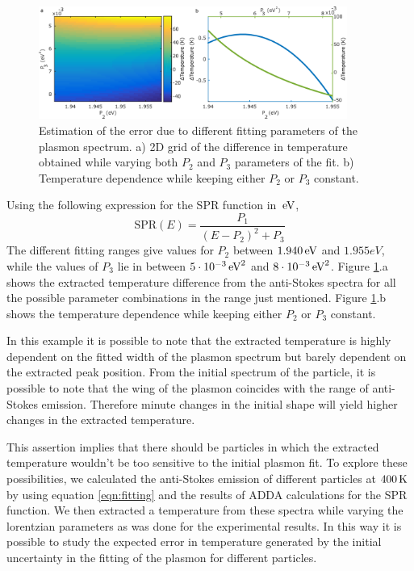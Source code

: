 \begin{figure}[htp] \centering
\includegraphics[width=0.90\textwidth]{Chapters/04_Anti-Stokes/Figures/05_Estimation_error/05_estimation_error.png}
\caption{Estimation of the error due to different fitting parameters of the
plasmon spectrum. a) 2D grid of the difference in temperature obtained while
varying both $P_2$ and $P_3$ parameters of the fit. b) Temperature dependence
while keeping either $P_2$ or $P_3$ constant.}
	\label{fig:estimation-error}
\end{figure}

Using the following expression for the SPR function in $\,\textrm{eV}$, 
\begin{equation*}
\textrm{SPR}(E) = \frac{P_1}{(E-P_2)^2+P_3}
\end{equation*}
The different fitting ranges give values for $P_2$ between $1.940\,\textrm{eV}$ and
$1.955eV$, while the values of $P_3$ lie in between $5\cdot10^{-3}\,\textrm{eV}^2$ and
$8\cdot10^{-3}\,\textrm{eV}^2$. Figure \ref{fig:estimation-error}.a shows the extracted
temperature difference from the anti-Stokes spectra for all the possible
parameter combinations in the range just mentioned. Figure \ref{fig:estimation-error}.b
shows the temperature dependence while keeping either $P_2$ or $P_3$ constant.

In this example it is possible to note that the extracted temperature is highly
dependent on the fitted width of the plasmon spectrum but barely dependent on
the extracted peak position. From the initial spectrum of the particle, it is
possible to note that the wing of the plasmon coincides with the range of
anti-Stokes emission. Therefore minute changes in the initial shape will yield
higher changes in the extracted temperature.

This assertion implies that there should be particles in which the extracted
temperature wouldn't be too sensitive to the initial plasmon fit. To explore
these possibilities, we calculated the anti-Stokes emission of different
particles at $400\,\textrm{K}$ by using equation \ref{eqn:fitting} and the results of ADDA
calculations for the SPR function. We then extracted a temperature from these
spectra while varying the lorentzian parameters as was done for the experimental
results. In this way it is possible to study the expected error in temperature
generated by the initial uncertainty in the fitting of the plasmon for different
particles. 


